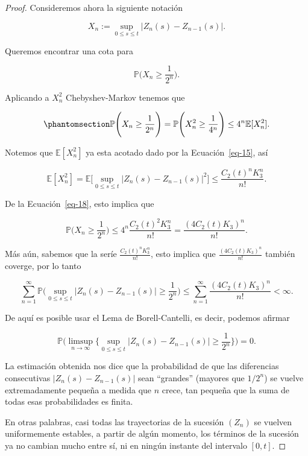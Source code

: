 \documentclass[
  spanish,
  us-letterpaper,
]{scrreprt}
\theoremstyle{plain}
\theoremstyle{plain}
\theoremstyle{plain}
\theoremstyle{definition}
\theoremstyle{remark}
\begin{document}
\begin{proof}
Consideremos ahora la siguiente notación

\[
    X_n:=\sup\limits_{0\leq s\leq t} |Z_n(s)-Z_{n-1}(s)|. 
\]

Queremos encontrar una cota para

\[
    \mathbb{P}\Bigg(X_n\geq\frac{1}{2^n}\Bigg).
\]

Aplicando a \(X_n^2\) Chebyshev-Markov tenemos que

\begin{equation}\phantomsection\label{eq-18}{
    \mathbb{P}\Bigg(X_n\geq\frac{1}{2^n}\Bigg)=\mathbb{P}\Bigg(X_n^2\geq \frac{1}{4^n}\Bigg)\leq 4^n\mathbb{E}[X_n^2].
}\end{equation}

Notemos que \(\mathbb{E}[X_n^2]\) ya esta acotado dado por la
Ecuación~\ref{eq-15}, así

\[
    \mathbb{E}[X_n^2]=\mathbb{E}\Bigg[\sup\limits_{0\leq s\leq t}|Z_n(s)-Z_{n-1}(s)|^2\Bigg]\leq \frac{C_2(t)^nK_3^n}{n!}.
\]

De la Ecuación~\ref{eq-18}, esto implica que

\[
    \mathbb{P}\Bigg(X_n\geq\frac{1}{2^n}\Bigg)\leq 4^n\frac{C_2(t)^2K_3^n}{n!}=\frac{(4C_2(t)K_3)^n}{n!}.
\]

Más aún, sabemos que la seríe
\(\displaystyle \frac{C_2(t)^nK_3^n}{n!}\), esto implica que
\(\displaystyle \frac{(4C_2(t)K_3)^n}{n!}\) también coverge, por lo
tanto

\[
    \sum\limits_{n=1}^{\infty} \mathbb{P}\Bigg(\sup\limits_{0\leq s\leq t}|Z_n(s)-Z_{n-1}(s)|\geq \frac{1}{2^n}\Bigg)\leq \sum\limits_{n=1}^{\infty} \frac{(4C_2(t)K_3)^n}{n!}<\infty.
\]

De aquí es posible usar el Lema de Borell-Cantelli, es decir, podemos
afirmar

\[
    \mathbb{P}\Bigg(\limsup\limits_{n\rightarrow \infty}\Bigg\{\sup\limits_{0\leq s\leq t}|Z_n(s)-Z_{n-1}(s)|\geq \frac{1}{2^n}\Bigg\}\Bigg)=0.
\]

La estimación obtenida nos dice que la probabilidad de que las
diferencias consecutivas \(|Z_n(s) - Z_{n-1}(s)|\) sean ``grandes''
(mayores que \(1/2^n\)) se vuelve extremadamente pequeña a medida que
\(n\) crece, tan pequeña que la suma de todas esas probabilidades es
finita.

En otras palabras, casi todas las trayectorias de la sucesión \((Z_n)\)
se vuelven uniformemente estables, a partir de algún momento, los
términos de la sucesión ya no cambian mucho entre sí, ni en ningún
instante del intervalo \([0,t]\).


\end{proof}
\end{document}

